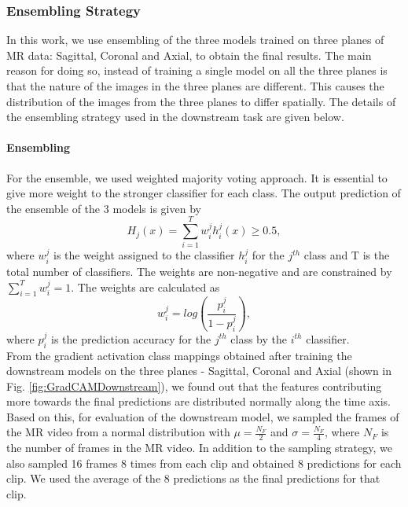 \documentclass[journal]{IEEEtai}
\begin{document}
\subsubsection{Ensembling Strategy}
\label{subsubsec:downstream_ensembling}
In this work, we use ensembling of the three models trained on three planes of MR data: Sagittal, Coronal and Axial, to obtain the final results. The main reason for doing so, instead of training a single model on all the three planes is that the nature of the images in the three planes are different. This causes the distribution of the images from the three planes to differ spatially. The details of the ensembling strategy used in the downstream task are given below.

\paragraph{Ensembling}
 For the ensemble, we used weighted majority voting \cite{ensemblebook} approach. It is essential to give more weight to the stronger classifier for each class. The output prediction of the ensemble of the 3 models is given by 
\begin{equation}
    H_j(x) = \sum_{i=1}^{T}w_i^j h_i^j(x) \geq 0.5,
\end{equation}
where $w_i^j$ is the weight assigned to the classifier $h_i^j$ for the $j^{th}$ class and T is the total number of classifiers. The weights are non-negative and are constrained by $\sum_{i=1}^{T} w_i^j = 1$. The weights are calculated as 
\begin{equation}
    w_i^j = log(\frac{p_i^j}{1-p_i^j}),
\end{equation}
where $p_i^j$ is the prediction accuracy for the $j^{th}$ class by the $i^{th}$ classifier.\\
\indent From the gradient activation class mappings obtained after training the downstream models on the three planes - Sagittal, Coronal and Axial (shown in Fig. \ref{fig:GradCAMDownstream}), we found out that the features contributing more towards the final predictions are distributed normally along the time axis. Based on this, for evaluation of the downstream model, we sampled the frames of the MR video from a normal distribution with $\mu = \frac{N_F}{2}$ and $\sigma = \frac{N_F}{4}$, where $N_F$ is the number of frames in the MR video. In addition to the sampling strategy, we also sampled 16 frames 8 times from each clip and obtained 8 predictions for each clip. We used the average of the 8 predictions as the final predictions for that clip.
\end{document}
